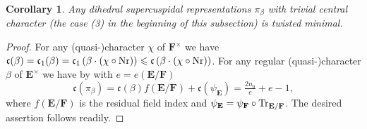 \documentclass[A4]{amsart}
\def\leq{\leqslant}
\newtheorem{corollary}  [theorem]{Corollary}
\numberwithin{equation}{section} \everymath{\displaystyle}
\newcommand{\Nr}{{\rm Nr}}
\newcommand{\Tr}{{\rm Tr}}
\newcommand{\E}{\mathbf{E}}
\newcommand{\F}{\mathbf{F}}
\newcommand{\cond}{\mathfrak{c}}
\begin{document}
\begin{corollary} \label{cor: DihTrivCenterIsTwistedMin}
	Any \emph{dihedral supercuspidal representations} $\pi_{\beta}$ with trivial central character (the case (3) in the beginning of this subsection) is twisted minimal.
\end{corollary}
\begin{proof}
	For any (quasi-)character $\chi$ of $\F^{\times}$ we have $\cond(\beta) = \cond_1(\beta) = \cond_1 \left(\beta \cdot (\chi \circ \Nr) \right) \leq \cond \left(\beta \cdot (\chi \circ \Nr) \right)$. For any regular (quasi-)character $\beta$ of $\E^{\times}$ we have by \cite[Theorem 4.7]{JL70} with $e=e(\E/\F)$
\begin{equation} \label{eq: CondRelDih} 
	\cond(\pi_{\beta}) = \cond(\beta) f(\E/\F) + \cond(\psi_{\E}) = \tfrac{2n_0}{e}+e-1, 
\end{equation}
	where $f(\E/\F)$ is the residual field index and $\psi_{\E} = \psi_{\F} \circ \Tr_{\E/\F}$. The desired assertion follows readily.
\end{proof}
\end{document}
